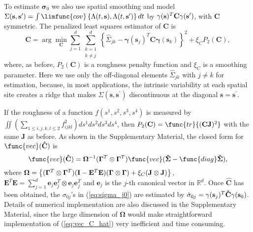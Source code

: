 \documentclass[titlepage,12pt]{article}
\begin{document}
To estimate $\mathbf{\sigma }_{0}$ we also use spatial smoothing and model $%
\Sigma (\mathbf{s},\mathbf{s}^{\prime })=\int \limfunc{cov}\left\{ \Lambda
(t,\mathbf{s}),\Lambda (t,\mathbf{s}^{\prime })\right\} dt$ by $\mathbf{%
\gamma }(\mathbf{s})^{T}\mathbf{C\gamma }(\mathbf{s}^{\prime })$, with $%
\mathbf{C}$ symmetric. The penalized least squares estimator of $\mathbf{C}$
is 
\begin{equation}
\mathbf{\hat{C}}=\arg \min_{\mathbf{C}}\sum_{j=1}^{d}\sum_{\substack{ k=1 \\ %
k\neq j}}^{d}\left\{ \hat{\Sigma}_{jk}-\mathbf{\gamma }(\mathbf{s}_{j})^{T}%
\mathbf{C\gamma }(\mathbf{s}_{k})\right\} ^{2}+\xi _{C}P_{2}(\mathbf{C}),
\label{eq:C_hat}
\end{equation}%
where, as before, $P_{2}(\mathbf{C})$ is a roughness penalty function and $%
\xi _{C}$ is a smoothing parameter. Here we use only the off-diagonal
elements $\hat{\Sigma}_{jk}$ with $j\neq k$ for estimation, because, in most
applications, the intrinsic variability at each spatial site creates a ridge
that makes $\Sigma (\mathbf{s},\mathbf{s}^{\prime })$ discontinuous at the
diagonal $\mathbf{s}=\mathbf{s}^{\prime }$.

If the roughness of a function $f(s^{1},s^{2},s^{3},s^{4})$ is measured by $%
\iint (\sum_{1\leq i,j,k,l\leq 2}f_{ijkl}^{2})ds^{1}ds^{2}ds^{3}ds^{4}$,
then $P_{2}(\mathbf{C})=\func{tr}\{(\mathbf{CJ})^{2}\}$ with the same $%
\mathbf{J}$ as before. As shown in the Supplementary Material, the closed
form for $\func{vec}(\mathbf{\hat{C}})$ is 
\begin{equation}
\func{vec}(\mathbf{\hat{C}})=\mathbf{\Omega }^{-1}(\mathbf{\Gamma }%
^{T}\otimes \mathbf{\Gamma }^{T})\func{vec}(\mathbf{\hat{\Sigma}}-\func{diag}%
\mathbf{\hat{\Sigma}}),  \label{eq:vec_C_hat}
\end{equation}%
where $\mathbf{\Omega }=\left\{ (\mathbf{\Gamma }^{T}\otimes \mathbf{\Gamma }%
^{T})(\mathbf{I}-\mathbf{E}^{T}\mathbf{E})(\mathbf{\Gamma }\otimes \mathbf{%
\Gamma })+\xi _{C}(\mathbf{J}\otimes \mathbf{J})\right\} $, $\mathbf{E}^{T}%
\mathbf{E}=\sum_{j=1}^{d}\mathbf{e}_{j}\mathbf{e}_{j}^{T}\otimes \mathbf{e}%
_{j}\mathbf{e}_{j}^{T}$ and $\mathbf{e}_{j}$ is the $j$-th canonical vector
in $\mathbb{R}^{d}$. Once $\mathbf{\hat{C}}$ has been obtained, the $\sigma
_{0j}$'s in (\ref{eq:sigma_j0}) are estimated by $\hat{\sigma}_{0j}=\mathbf{%
\gamma }(\mathbf{s}_{j})^{T}\mathbf{\hat{C}\gamma }(\mathbf{s}_{0})$.
Details of numerical implementation are also discussed in the Supplementary
Material, since the large dimension of $\mathbf{\Omega }$ would make
straightforward implementation of (\ref{eq:vec_C_hat}) very inefficient and
time consuming.
\end{document}
